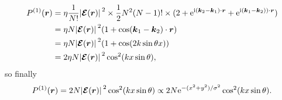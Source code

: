 \documentclass[hyperref, a4paper]{article}
\newcommand*{\ii}{\mathrm{i}}
\newcommand*{\ee}{\mathrm{e}}
\begin{document}
\begin{itemize}
\[\begin{aligned}
        P^{(1)}(\vb*{r}) &= \eta \frac{1}{N!} \abs*{\vb*{\mathcal{E}} (\vb*{r})}^2 \times \frac{1}{2} N^2 (N-1)! 
        \times (2 + \ee^{\ii (\vb*{k}_2 - \vb*{k}_1) \cdot \vb*{r}} + \ee^{\ii (\vb*{k}_1 - \vb*{k}_2)) \cdot \vb*{r} }) \\
        &= \eta N \abs*{\vb*{\mathcal{E}}(\vb*{r})}^2 (1 + \cos (\vb*{k}_1 - \vb*{k}_2) \cdot \vb*{r}) \\
        &= \eta N \abs*{\vb*{\mathcal{E}}(\vb*{r})}^2 (1 + \cos (2 k \sin \theta x)) \\
        &=  2\eta N \abs*{\vb*{\mathcal{E}}(\vb*{r})}^2 \cos^2 (k x \sin \theta ), 
    \end{aligned}
\]
so finally 
\begin{equation}
    P^{(1)}(\vb*{r}) = 2 N \abs*{\vb*{\mathcal{E}}(\vb*{r})}^2 \cos^2 (k x \sin \theta)  
    \propto 2 N \ee^{- (x^2 + y^2) / \sigma^2} \cos^2 (k x \sin \theta).
\end{equation}


\end{itemize}
\end{document}
